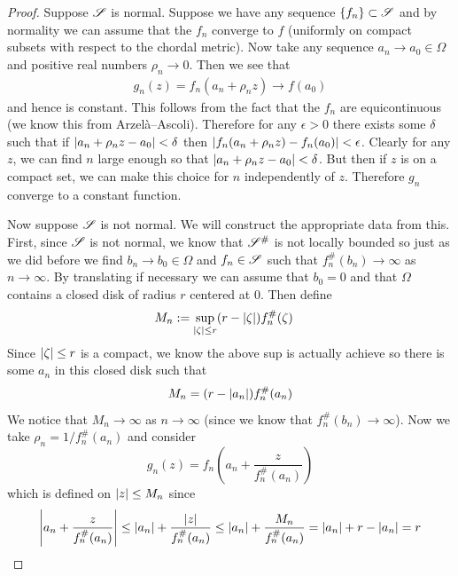 \begin{proof}
    Suppose $\mathscr{S}$ is normal. Suppose we have any sequence $\{f_n\} \subset \mathscr{S}$ and by normality we can assume that the $f_n$ converge to $f$ (uniformly on compact subsets with respect to the chordal metric). Now take any sequence $a_n \to a_0 \in \Omega$ and positive real numbers $\rho_n \to 0$. Then we see that 
    \begin{align*}
        g_n(z) = f_n(a_n + \rho_n z) \to f(a_0)
    \end{align*}
    and hence is constant. This follows from the fact that the $f_n$ are equicontinuous (we know this from Arzelà–Ascoli). Therefore for any $\epsilon > 0$ there exists some $\delta$ such that if $\left|a_n + \rho_n z - a_0\right| < \delta$ then $\left|f_n(a_n + \rho_n z) - f_n(a_0)\right| < \epsilon$. Clearly for any $z$, we can find $n$ large enough so that $\left|a_n + \rho_n z - a_0\right| < \delta$. But then if $z$ is on a compact set, we can make this choice for $n$ independently of $z$. Therefore $g_n$ converge to a constant function.
    
    Now suppose $\mathscr{S}$ is not normal. We will construct the appropriate data from this. First, since $\mathscr{S}$ is not normal, we know that $\mathscr{S}^\#$ is not locally bounded so just as we did before we find $b_n \to b_0 \in \Omega$ and $f_n \in \mathscr{S}$ such that $f_n^\#(b_n) \to \infty$ as $n \to \infty$. By translating if necessary we can assume that $b_0 = 0$ and that $\Omega$ contains a closed disk of radius $r$ centered at 0. Then define
    \begin{align*}
        M_n &:= \sup_{\left|\zeta\right| \leq r} (r - \left|\zeta\right|) f_n^\#(\zeta)
    \end{align*}
    Since $\left|\zeta\right| \leq r$ is a compact, we know the above sup is actually achieve so there is some $a_n$ in this closed disk such that 
    $$M_n = (r - \left|a_n\right|) f_n^\#(a_n)$$
    We notice that $M_n \to \infty$ as $n \to \infty$ (since we know that $f_n^\#(b_n) \to \infty$). Now we take $\rho_n = 1/f_n^\#(a_n)$ and consider
    $$g_n(z) = f_n \left( a_n + \frac{z}{f_n^\#(a_n)} \right)$$
    which is defined on $\left|z\right| \leq M_n$ since 
    \begin{align*}
        \left|a_n + \frac{z}{f_n^\#(a_n)}\right| \leq \left|a_n\right| +\frac{\left|z\right|}{f_n^\#(a_n)} \leq \left|a_n\right| +\frac{M_n}{f_n^\#(a_n)} = \left|a_n\right| + r - \left|a_n\right| = r
    \end{align*}


\end{proof}
